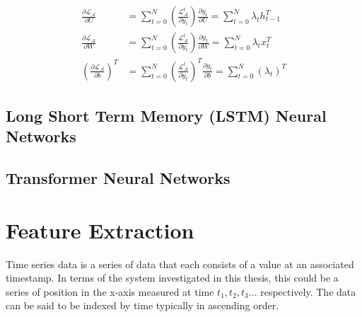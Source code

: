 \begin{equation}
    \begin{split}
        \frac{\partial \mathcal{L}_\mathcal{A}}{\partial U} &= \sum_{t=0}^{N}\left(\frac{\mathcal{L}_\mathcal{A}^t}{\partial y_t}\right) \frac{\partial y_t}{\partial U} = \sum_{t=0}^{N}\lambda_t h_{t-1}^T \\
        \frac{\partial \mathcal{L}_\mathcal{A}}{\partial W} &= \sum_{t=0}^{N}\left(\frac{\mathcal{L}_\mathcal{A}^t}{\partial y_t}\right) \frac{\partial y_t}{\partial W} = \sum_{t=0}^{N}\lambda_t x_{t}^T \\
        \left(\frac{\partial \mathcal{L}_\mathcal{A}}{\partial b}\right)^T &= \sum_{t=0}^{N}\left(\frac{\mathcal{L}_\mathcal{A}^t}{\partial y_t}\right)^T \frac{\partial y_t}{\partial b} = \sum_{t=0}^{N} (\lambda_t)^T
    \end{split}
\end{equation}

\subsection{Long Short Term Memory (LSTM) Neural Networks}
\subsection{Transformer Neural Networks}

\section{Feature Extraction}
Time series data is a series of data that each consists of a value at an associated timestamp. In terms of the system investigated in this thesis, this could be a series of position in the x-axis measured at time $t_1, t_2, t_3...$ respectively. The data can be said to be indexed by time \cite{yinPredictionAnalysisTime2023} typically in ascending order.


